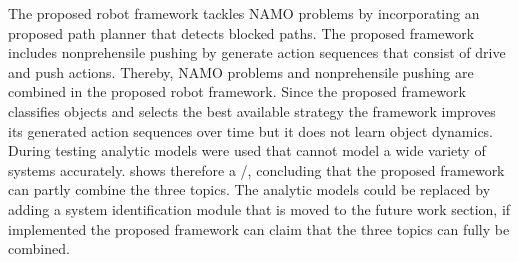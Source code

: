 The proposed robot framework tackles \ac{NAMO} problems by incorporating an proposed path planner that detects blocked paths. The proposed framework includes nonprehensile pushing by generate action sequences that consist of drive and push actions. Thereby, \ac{NAMO} problems and nonprehensile pushing are combined in the proposed robot framework. Since the proposed framework classifies objects and selects the best available strategy the framework improves its generated action sequences over time but it does not learn object dynamics. During testing analytic models were used that cannot model a wide variety of systems accurately.  shows therefore a \xmark/\cmark, concluding that the proposed framework can partly combine the three topics. The analytic models could be replaced by adding a system identification module that is moved to the future work section, if implemented the proposed framework can claim that the three topics can fully be combined.\bs
